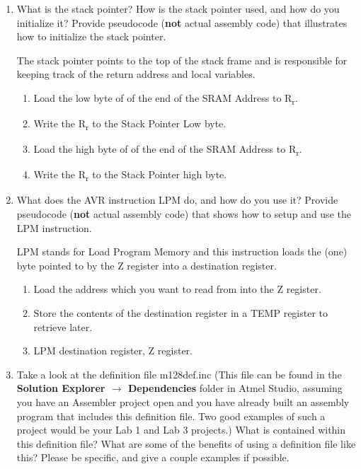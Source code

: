 \documentclass[12pt,letterpaper]{article}
\begin{document}
\begin{enumerate}
	\item 
	What is the stack pointer? 
	How is the stack pointer used, and how do you initialize it? 
	Provide pseudocode (\textbf{not} actual assembly code) that illustrates how to initialize the stack pointer.
	
	The stack pointer points to the top of the stack frame and is responsible for keeping track of the return address and local variables.
	
	\begin{enumerate}
		\item Load the low byte of of the end of the SRAM Address to R\textsubscript{r}.
		\item Write the R\textsubscript{r} to the Stack Pointer Low byte.
		\item Load the high byte of of the end of the SRAM Address to R\textsubscript{r}.
		\item Write the R\textsubscript{r} to the Stack Pointer high byte.
	\end{enumerate}
	
	
	\item 
	What does the AVR instruction LPM do, and how do you use it?
	Provide pseudocode (\textbf{not} actual assembly code) that shows how to setup and use the LPM instruction.

	LPM stands for Load Program Memory and this instruction loads the (one) byte pointed to by the Z register into a destination register.
	
	\begin{enumerate}
		\item Load the address which you want to read from into the Z register.
		\item Store the contents of the destination register in a TEMP register to retrieve later.
		\item LPM destination register, Z register.
	\end{enumerate}
	
	
	\item 
	Take a look at the definition file m128def.inc (This file can be found in the \textbf{Solution Explorer $ \rightarrow$  Dependencies} folder in Atmel Studio, assuming you have an Assembler project open and you have already built an assembly program that includes this definition file. 
	Two good examples of such a project would be your Lab 1 and Lab 3 projects.) What is contained within this definition file? 
	What are some of the benefits of using a definition file like this? 
	Please be specific, and give a couple examples if possible.


\end{enumerate}
\end{document}

